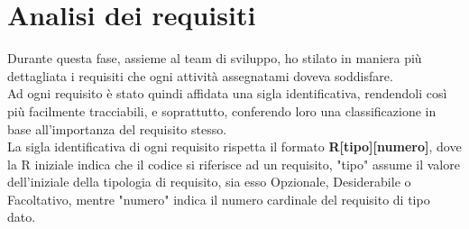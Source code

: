 \section{Analisi dei requisiti}
Durante questa fase, assieme al team di sviluppo, ho stilato in maniera più dettagliata i requisiti che ogni attività assegnatami doveva soddisfare.\\
Ad ogni requisito è stato quindi affidata una sigla identificativa, rendendoli così più facilmente tracciabili, e soprattutto, conferendo loro una classificazione in base all'importanza del requisito stesso.\\
La sigla identificativa di ogni requisito rispetta il formato \textbf{R[tipo][numero]}, dove la R iniziale indica che il codice si riferisce ad un requisito, "tipo" assume il valore dell'iniziale della tipologia di requisito, sia esso Opzionale, Desiderabile o Facoltativo, mentre "numero" indica il numero cardinale del requisito di tipo dato.

